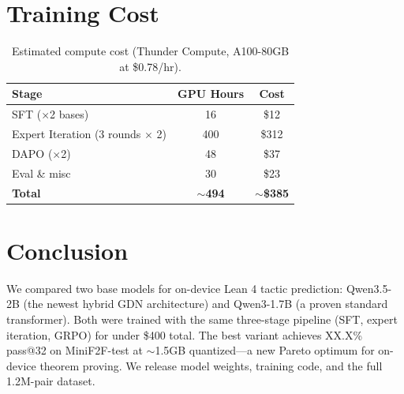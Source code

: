 \documentclass[11pt,a4paper]{article}
\begin{document}
\section{Training Cost}

\begin{table}[h]
\centering
\caption{Estimated compute cost (Thunder Compute, A100-80GB at \$0.78/hr).}
\begin{tabular}{lcc}
\toprule
\textbf{Stage} & \textbf{GPU Hours} & \textbf{Cost} \\
\midrule
SFT ($\times$2 bases) & 16 & \$12 \\
Expert Iteration (3 rounds $\times$ 2) & 400 & \$312 \\
DAPO ($\times$2) & 48 & \$37 \\
Eval \& misc & 30 & \$23 \\
\midrule
\textbf{Total} & \textbf{$\sim$494} & \textbf{$\sim$\$385} \\
\bottomrule
\end{tabular}
\label{tab:cost}
\end{table}

\section{Conclusion}

We compared two base models for on-device Lean 4 tactic prediction: Qwen3.5-2B (the newest hybrid GDN architecture) and Qwen3-1.7B (a proven standard transformer). Both were trained with the same three-stage pipeline (SFT, expert iteration, GRPO) for under \$400 total. The best variant achieves XX.X\% pass@32 on MiniF2F-test at $\sim$1.5GB quantized---a new Pareto optimum for on-device theorem proving. We release model weights, training code, and the full 1.2M-pair dataset.


\end{document}
